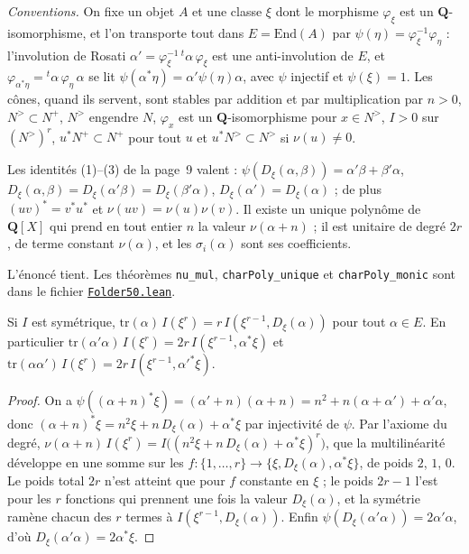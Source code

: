 \noindent\emph{Conventions.} On fixe un objet $A$ et une classe $\xi$ dont le morphisme $\varphi_\xi$ est un $\mathbf Q$-isomorphisme, et l'on transporte tout dans $E = \mathrm{End}(A)$ par $\psi(\eta) = \varphi_\xi^{-1}\varphi_\eta$ : l'involution de Rosati $\alpha' = \varphi_\xi^{-1}\,{}^t\alpha\,\varphi_\xi$ est une anti-involution de $E$, et $\varphi_{\alpha^*\eta} = {}^t\alpha\,\varphi_\eta\,\alpha$ se lit $\psi(\alpha^*\eta) = \alpha'\psi(\eta)\alpha$, avec $\psi$ injectif et $\psi(\xi) = 1$. Les cônes, quand ils servent, sont stables par addition et par multiplication par $n > 0$, $N^> \subset N^+$, $N^>$ engendre $N$, $\varphi_x$ est un $\mathbf Q$-isomorphisme pour $x \in N^>$, $I > 0$ sur $(N^>)^r$, $u^*N^+ \subset N^+$ pour tout $u$ et $u^*N^> \subset N^>$ si $\nu(u) \neq 0$.

\begin{enonce}
Les identités (1)--(3) de la page~9 valent : $\psi(D_\xi(\alpha, \beta)) = \alpha'\beta + \beta'\alpha$, $D_\xi(\alpha, \beta) = D_\xi(\alpha'\beta) = D_\xi(\beta'\alpha)$, $D_\xi(\alpha') = D_\xi(\alpha)$ ; de plus $(uv)^* = v^*u^*$ et $\nu(uv) = \nu(u)\nu(v)$. Il existe un unique polynôme de $\mathbf Q[X]$ qui prend en tout entier $n$ la valeur $\nu(\alpha + n)$ ; il est unitaire de degré $2r$, de terme constant $\nu(\alpha)$, et les $\sigma_i(\alpha)$ sont ses coefficients.
\end{enonce}

\noindent L'énoncé tient. Les théorèmes \texttt{nu\_mul}, \texttt{charPoly\_unique} et \texttt{charPoly\_monic} sont dans le fichier \href{\leanblob/AlgebraicGeometry/Folder50.lean}{\texttt{Folder50.\allowbreak{}lean}}.

\begin{encadre}
\begin{theoreme}
Si $I$ est symétrique, $\mathrm{tr}(\alpha)\, I(\xi^r) = r\, I(\xi^{r-1}, D_\xi(\alpha))$ pour tout $\alpha \in E$. En particulier $\mathrm{tr}(\alpha'\alpha)\, I(\xi^r) = 2r\, I(\xi^{r-1}, \alpha^*\xi)$ et $\mathrm{tr}(\alpha\alpha')\, I(\xi^r) = 2r\, I(\xi^{r-1}, \alpha'^*\xi)$.
\end{theoreme}
\end{encadre}

\begin{proof}
On a $\psi((\alpha + n)^*\xi) = (\alpha' + n)(\alpha + n) = n^2 + n(\alpha + \alpha') + \alpha'\alpha$, donc $(\alpha + n)^*\xi = n^2\xi + n\,D_\xi(\alpha) + \alpha^*\xi$ par injectivité de $\psi$. Par l'axiome du degré, $\nu(\alpha + n)\, I(\xi^r) = I\bigl((n^2\xi + n\,D_\xi(\alpha) + \alpha^*\xi)^r\bigr)$, que la multilinéarité développe en une somme sur les $f : \{1, \dots, r\} \to \{\xi, D_\xi(\alpha), \alpha^*\xi\}$, de poids $2$, $1$, $0$. Le poids total $2r$ n'est atteint que pour $f$ constante en $\xi$ ; le poids $2r - 1$ l'est pour les $r$ fonctions qui prennent une fois la valeur $D_\xi(\alpha)$, et la symétrie ramène chacun des $r$ termes à $I(\xi^{r-1}, D_\xi(\alpha))$. Enfin $\psi(D_\xi(\alpha'\alpha)) = 2\alpha'\alpha$, d'où $D_\xi(\alpha'\alpha) = 2\alpha^*\xi$.
\end{proof}

